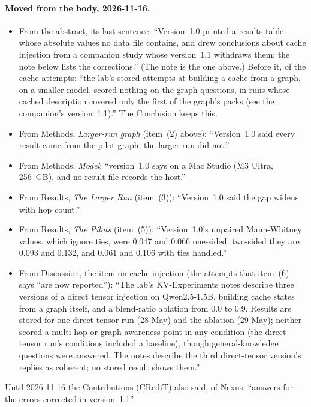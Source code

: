 \documentclass[11pt,a4paper]{article}
\begin{document}
\paragraph{Moved from the body, 2026-11-16.}
\begin{itemize}
\item From the abstract, its last sentence: ``Version~1.0 printed a results table whose absolute values no data file contains, and drew conclusions about cache injection from a companion study whose version~1.1 withdraws them; the note below lists the corrections.'' (The note is the one above.) Before it, of the cache attempts: ``the lab's stored attempts at building a cache from a graph, on a smaller model, scored nothing on the graph questions, in runs whose cached description covered only the first of the graph's packs (see the companion's version~1.1).'' The Conclusion keeps this.
\item From Methods, \emph{Larger-run graph} (item~(2) above): ``Version~1.0 said every result came from the pilot graph; the larger run did not.''
\item From Methods, \emph{Model}: ``version~1.0 says on a Mac Studio (M3 Ultra, 256~GB), and no result file records the host.''
\item From Results, \emph{The Larger Run} (item~(3)): ``Version~1.0 said the gap widens with hop count.''
\item From Results, \emph{The Pilots} (item~(5)): ``Version~1.0's unpaired Mann-Whitney values, which ignore ties, were 0.047 and 0.066 one-sided; two-sided they are 0.093 and 0.132, and 0.061 and 0.106 with ties handled.''
\item From Discussion, the item on cache injection (the attempts that item~(6) says ``are now reported''): ``The lab's KV-Experiments notes describe three versions of a direct tensor injection on Qwen2.5-1.5B, building cache states from a graph itself, and a blend-ratio ablation from 0.0 to 0.9. Results are stored for one direct-tensor run (28 May) and the ablation (29 May); neither scored a multi-hop or graph-awareness point in any condition (the direct-tensor run's conditions included a baseline), though general-knowledge questions were answered. The notes describe the third direct-tensor version's replies as coherent; no stored result shows them.''
\end{itemize}
Until 2026-11-16 the Contributions (CRediT) also said, of Nexus: ``answers for the errors corrected in version~1.1''.



\end{document}
